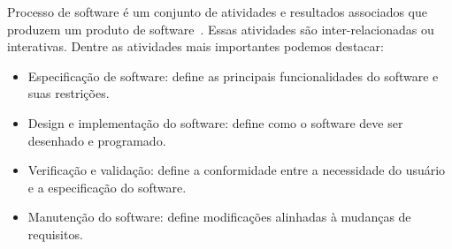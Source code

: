 Processo de software é um conjunto de atividades e resultados associados que produzem um produto de software~\cite{sommerville2007engenharia}.
Essas atividades são inter-relacionadas ou interativas.
Dentre as atividades mais importantes podemos destacar:

\begin{itemize}
	\item Especificação de software: define as principais funcionalidades do software e suas restrições.
	\item Design e implementação do software: define como o software deve ser desenhado e programado.
	\item Verificação e validação: define a conformidade entre a necessidade do usuário e a especificação do software.
	\item Manutenção do software: define modificações alinhadas à mudanças de requisitos.
\end{itemize}


